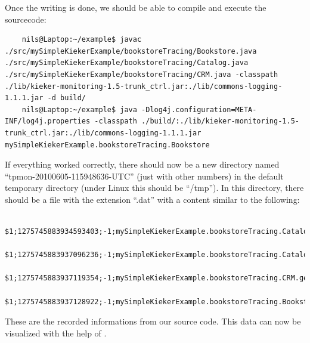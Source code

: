       Once the writing is done, we should be able to compile and execute the sourcecode:
      \setBashListing
      \begin{lstlisting}
	nils@Laptop:~/example$ javac ./src/mySimpleKiekerExample/bookstoreTracing/Bookstore.java ./src/mySimpleKiekerExample/bookstoreTracing/Catalog.java ./src/mySimpleKiekerExample/bookstoreTracing/CRM.java -classpath ./lib/kieker-monitoring-1.5-trunk_ctrl.jar:./lib/commons-logging-1.1.1.jar -d build/
	nils@Laptop:~/example$ java -Dlog4j.configuration=META-INF/log4j.properties -classpath ./build/:./lib/kieker-monitoring-1.5-trunk_ctrl.jar:./lib/commons-logging-1.1.1.jar mySimpleKiekerExample.bookstoreTracing.Bookstore
      \end{lstlisting}
      If everything worked correctly, there should now be a new directory named ``tpmon-20100605-115948636-UTC'' (just with other numbers) in the default temporary directory (under Linux this should be ``/tmp''). In this directory, there should be a file with the extension ``.dat'' with a content similar to the following:
      \begin{lstlisting}
	$1;1275745883934593403;-1;mySimpleKiekerExample.bookstoreTracing.Catalog.getBook(false);sessionID;0;1275745883931011663;1275745883933424540;vnName;1;1
	$1;1275745883937096236;-1;mySimpleKiekerExample.bookstoreTracing.Catalog.getBook(false);sessionID;0;1275745883935003302;1275745883937075214;vnName;3;2
	$1;1275745883937119354;-1;mySimpleKiekerExample.bookstoreTracing.CRM.getOffers();sessionID;0;1275745883934661568;1275745883937111043;vnName;2;1
	$1;1275745883937128922;-1;mySimpleKiekerExample.bookstoreTracing.Bookstore.searchBook();sessionID;0;1275745883931007961;1275745883937123824;vnName;0;0 
      \end{lstlisting}
      These are the recorded informations from our source code. This data can now be visualized with the help of \Kieker.

